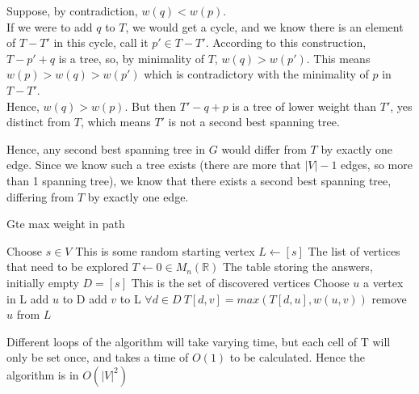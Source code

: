 \documentclass{scrartcl}
\begin{document}
Suppose, by contradiction, \( w(q) < w(p) \). \\
If we were to add \( q \) to \( T \), we would get a cycle, and we know there is an element of \( T - T' \) in this cycle, call it \( p' \in T - T'\).
According to this construction, \( T - p' + q \) is a tree, so, by minimality of \( T \), \( w(q) > w(p') \).
This means \( w(p) > w(q) > w(p') \) which is contradictory with the minimality of \( p \) in \( T - T' \).\\
Hence, \( w(q) > w(p) \). But then \( T' - q + p \) is a tree of lower weight than \( T'\), yes distinct from \( T \), which means \( T' \) is not a second best spanning tree.


Hence, any second best spanning tree in \( G \) would differ from \( T \) by exactly one edge. Since we know such a tree exists (there are more that \( |V| - 1 \) edges, so more than 1 spanning tree), we know that there exists a second best spanning tree, differing from \( T \) by exactly one edge.



\begin{algorithm}
  \caption{Gte max weight in path}
  \label{oscar garnier}
  \begin{algorithmic}[1]

		\State Choose \( s \in V \)
		\Comment This is some random starting vertex
		\State \( L \gets [s] \)
		\Comment The list of vertices that need to be explored
		\State \( T \gets 0 \in M_{n}(\mathbb{R}) \)
		\Comment The table storing the answers, initially empty
		\State \( D = [s] \)
		\Comment This is the set of discovered vertices
				\State Choose \( u \) a vertex in L
				\State add \( u \) to D
				\State add \( v \) to L
				\State \( \forall d \in D \ T[d,v] = max(T[d,u],w(u,v)) \)
				\EndFor
				\State remove \( u \) from \( L \)
      \EndWhile
      \label{euclidendwhile}
      \State {}
    \EndFunction
  \end{algorithmic}
\end{algorithm}

Different loops of the algorithm will take varying time, but each cell of T will only be set once, and takes a time of \( O(1) \) to be calculated. Hence the algorithm is in \( O(|V|^2) \)
\end{document}
